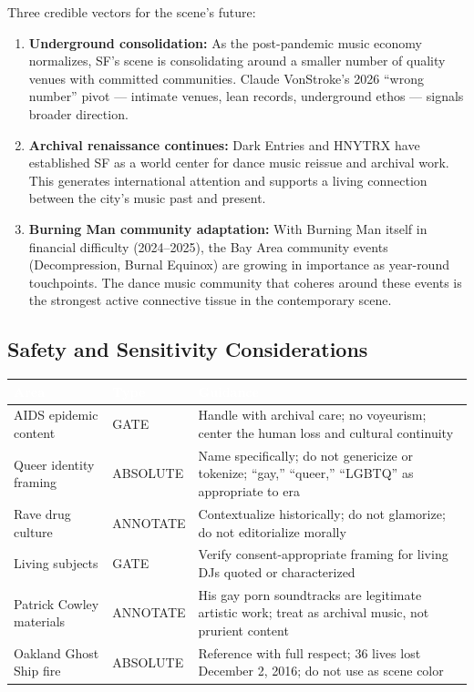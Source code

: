 \documentclass[11pt,letterpaper]{article}
\newcommand{\tableheader}[1]{\textbf{\sffamily\textcolor{white}{#1}}}
\begin{document}
Three credible vectors for the scene's future:

\begin{enumerate}
  \item \textbf{Underground consolidation:} As the post-pandemic music economy normalizes, SF's scene is consolidating around a smaller number of quality venues with committed communities. Claude VonStroke's 2026 ``wrong number'' pivot --- intimate venues, lean records, underground ethos --- signals broader direction.
  \item \textbf{Archival renaissance continues:} Dark Entries and HNYTRX have established SF as a world center for dance music reissue and archival work. This generates international attention and supports a living connection between the city's music past and present.
  \item \textbf{Burning Man community adaptation:} With Burning Man itself in financial difficulty (2024--2025), the Bay Area community events (Decompression, Burnal Equinox) are growing in importance as year-round touchpoints. The dance music community that coheres around these events is the strongest active connective tissue in the contemporary scene.
\end{enumerate}

\subsection{Safety and Sensitivity Considerations}

\begin{center}
\begin{tabularx}{\textwidth}{L{3.5cm}L{2.5cm}X}
\toprule
{}
\tableheader{Area} & \tableheader{Type} & \tableheader{Guidance} \\
\midrule
AIDS epidemic content & GATE & Handle with archival care; no voyeurism; center the human loss and cultural continuity \\
Queer identity framing & ABSOLUTE & Name specifically; do not genericize or tokenize; ``gay,'' ``queer,'' ``LGBTQ'' as appropriate to era \\
Rave drug culture & ANNOTATE & Contextualize historically; do not glamorize; do not editorialize morally \\
Living subjects & GATE & Verify consent-appropriate framing for living DJs quoted or characterized \\
Patrick Cowley materials & ANNOTATE & His gay porn soundtracks are legitimate artistic work; treat as archival music, not prurient content \\
Oakland Ghost Ship fire & ABSOLUTE & Reference with full respect; 36 lives lost December 2, 2016; do not use as scene color \\
\bottomrule
\end{tabularx}
\end{center}
\end{document}
